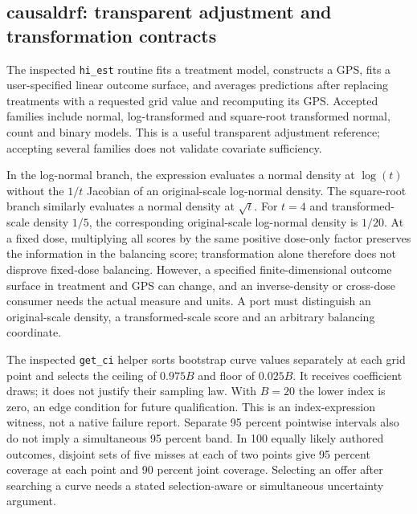 \subsection{causaldrf: transparent adjustment and transformation contracts}
The inspected \texttt{hi\_est} routine fits a treatment model, constructs a GPS,
fits a user-specified linear outcome surface, and averages predictions after
replacing treatments with a requested grid value and recomputing its GPS.
Accepted families include normal, log-transformed and square-root transformed
normal, count and binary models. This is a useful transparent adjustment
reference; accepting several families does not validate covariate sufficiency.
\citep{exec24_dose_causaldrf}

In the log-normal branch, the expression evaluates a normal density at
$\log(t)$ without the $1/t$ Jacobian of an original-scale log-normal density.
The square-root branch similarly evaluates a normal density at $\sqrt t$.
For $t=4$ and transformed-scale density $1/5$, the corresponding original-scale
log-normal density is $1/20$. At a fixed dose, multiplying all scores by the
same positive dose-only factor preserves the information in the balancing
score; transformation alone therefore does not disprove fixed-dose balancing.
However, a specified finite-dimensional outcome surface in treatment and GPS
can change, and an inverse-density or cross-dose consumer needs the actual
measure and units. A port must distinguish an original-scale density, a
transformed-scale score and an arbitrary balancing coordinate.
\citep{exec24_dose_causaldrf,exec24_dose_contract}

The inspected \texttt{get\_ci} helper sorts bootstrap curve values separately
at each grid point and selects the ceiling of $0.975B$ and floor of $0.025B$.
It receives coefficient draws; it does not justify their sampling law. With
$B=20$ the lower index is zero, an edge condition for future qualification.
This is an index-expression witness, not a native failure report. Separate
95 percent pointwise intervals also do not imply a simultaneous 95 percent
band. In 100 equally likely authored outcomes, disjoint sets of five misses
at each of two points give 95 percent coverage at each point and 90 percent
joint coverage. Selecting an offer after searching a curve needs a stated
selection-aware or simultaneous uncertainty argument.
\citep{exec24_dose_causaldrf,exec24_dose_contract}

